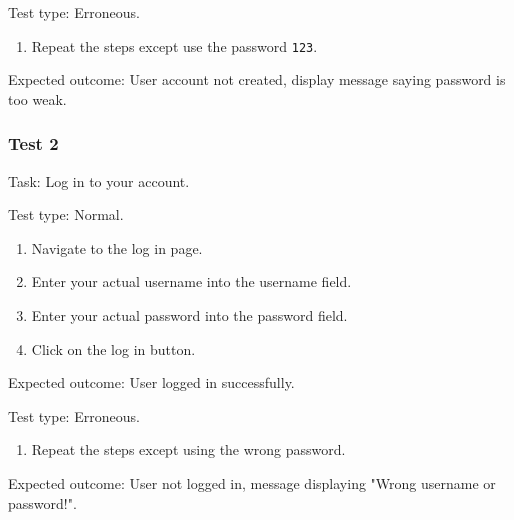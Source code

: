 {\color{gray} \hrulefill}

{\sffamily Test type: Erroneous.} \\

\begin{enumerate}
\item Repeat the steps except use the password \texttt{123}.
\end{enumerate}

{\sffamily Expected outcome:} User account not created, display
message saying password is too weak.\\

{\color{gray} \hrulefill}

\vspace{0.2cm}

\subsubsection{Test 2}

{\sffamily Task:} Log in to your account.\\

{\color{gray} \hrulefill}

{\sffamily Test type: Normal.}\\

\begin{enumerate}
  \item Navigate to the log in page.
  \item Enter your actual username into the username field.
  \item Enter your actual password into the password field.
  \item Click on the log in button.
\end{enumerate}

{\sffamily Expected outcome:} User logged in successfully. \\

{\color{gray} \hrulefill}

{\sffamily Test type: Erroneous.}\\

\begin{enumerate}
  \item Repeat the steps except using the wrong password.
\end{enumerate}

{\sffamily Expected outcome:} User not logged in,
message displaying "Wrong username or password!". \\

{\color{gray} \hrulefill}

